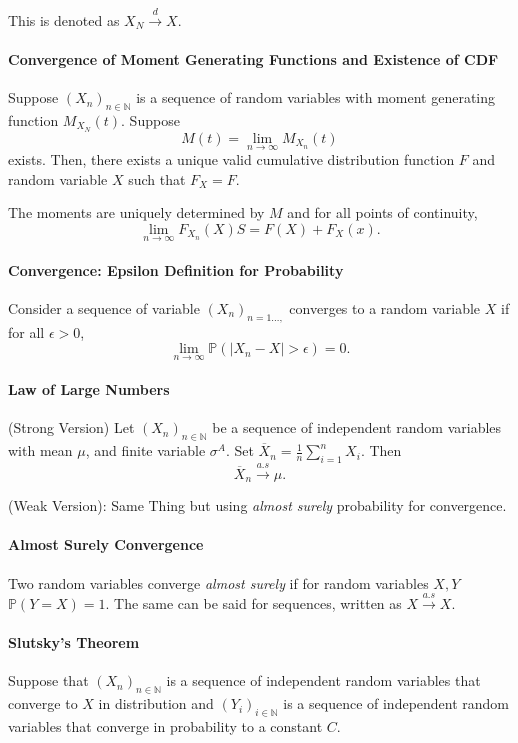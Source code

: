 This is denoted as \( X_N \xrightarrow{d} X \).

\paragraph{Convergence of Moment Generating Functions and Existence of CDF}
Suppose \( (X_n)_{n \in  \mathbb{N}} \) is a sequence of random variables with
moment generating function  \( M_{X_N}(t) \).
Suppose  \[
    M(t) = \lim_{n \to \infty} M_{X_n}(t)
\]
exists. Then, there exists a unique valid cumulative distribution function
\( F \)  and random variable  \( X \) such that
 \( F_X = F \).

The moments are uniquely determined by \( M \) and for all
points of continuity,  \[
    \lim_{n \to  \infty} F_{X_n} (X)S = F(X) + F_X(x)
.\]

\paragraph{Convergence: Epsilon Definition for Probability}
Consider a sequence of variable \( (X_n)_{n=1 \ldots,} \) converges
to a random variable \( X \) if for all  \( \epsilon > 0 \), \[
    \lim_{n \to \infty} \mathbb{P}( |X_n - X| > \epsilon ) = 0
.\]

\paragraph{Law of Large Numbers}
(Strong Version) Let \( (X_n)_{n \in \mathbb{N}} \) be a sequence of independent
random variables with mean \( \mu \), and finite variable  \( \sigma^A\).
Set \( \overline{X}_n = \frac{1}{n} \sum_{i=1}^n X_i \).
Then  \[
    \overline{X}_n \xrightarrow{a.s} \mu
.\]

(Weak Version): Same Thing but using \textit{almost surely}
probability for convergence.

\paragraph{Almost Surely Convergence}
Two random variables converge \textit{almost surely} if for
random variables \( X, Y \)
\( \mathbb{P}(Y = X) = 1 \). The same can be said for sequences,
written as \( X \xrightarrow{a.s} X\).

\paragraph{Slutsky's Theorem}
Suppose that \((X_n)_{n \in \mathbb{N}}\) is a sequence of independent random
variables that converge to \(X\) in distribution and
\((Y_i)_{i \in \mathbb{N}}\) is a sequence of independent random variables that
converge in probability to a constant \(C\).


